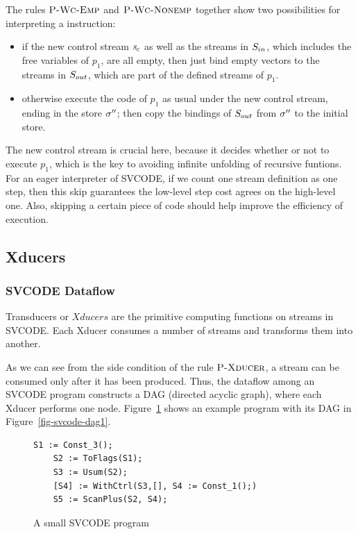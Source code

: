 The rules $\textsc{P-Wc-Emp}$ and $\textsc{P-Wc-Nonemp}$ together show two possibilities for interpreting a \wc instruction:
\begin{itemize}
	\item if the new control stream $\mathit{s}_c$ as well as the streams in $S_{in}$, which includes the free variables of $p_1$, are all empty, then just bind empty vectors to the streams in $S_{out}$, which are part of the defined streams of $p_1$.
	\item otherwise execute the code of $p_1$ as usual under the new control stream, ending in the store $\sigma''$; then copy the bindings of $S_{out}$ from $\sigma''$ to the initial store. 
\end{itemize}
The new control stream is crucial here, because it decides whether or not to execute $p_1$, which is the key to avoiding infinite unfolding of recursive funtions. For an eager interpreter of SVCODE, if we count one stream definition as one step, then this skip guarantees the low-level step cost agrees on the high-level one. Also, skipping a certain piece of code should help improve the efficiency of execution.



\subsection{Xducers}

\subsubsection{SVCODE Dataflow}
Transducers or $Xducers$ are the primitive computing functions on streams in SVCODE. Each Xducer consumes a number of streams and transforms them into another. 

As we can see from the side condition of the rule $\textsc{P-Xducer}$, a stream can be consumed only after it has been produced.
Thus, the dataflow among an SVCODE program constructs a DAG (directed acyclic graph), where each Xducer performs one node. 
Figure~\ref{fig-svcode-eg1} shows an example program with its DAG in Figure~\ref{fig-svcode-dag1}. \\

\begin{figure}[h]
	\begin{lstlisting}[style=svcode-style]
	S1 := Const_3();
	S2 := ToFlags(S1);
	S3 := Usum(S2);
	[S4] := WithCtrl(S3,[], S4 := Const_1();)
	S5 := ScanPlus(S2, S4);
	\end{lstlisting}	
\caption{A small SVCODE program \label{fig-svcode-eg1}}
\end{figure}
	

